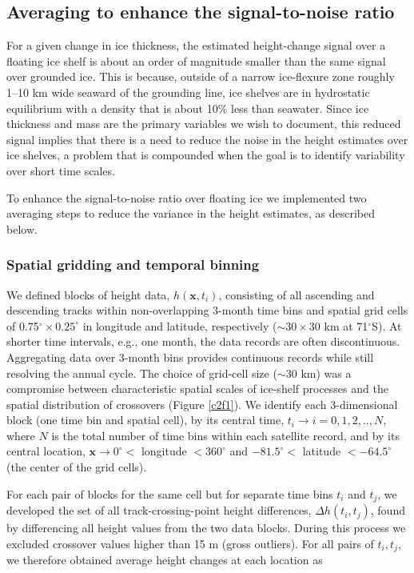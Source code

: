 \subsection{Averaging to enhance the signal-to-noise ratio}

For a given change in ice thickness, the estimated height-change signal over a floating ice shelf is about an order of magnitude smaller than the same signal over grounded ice. This is because, outside of a narrow ice-flexure zone roughly 1--10 km wide seaward of the grounding line, ice shelves are in hydrostatic equilibrium with a density that is about 10\% less than seawater. Since ice thickness and mass are the primary variables we wish to document, this reduced signal implies that there is a need to reduce the noise in the height estimates over ice shelves, a problem that is compounded when the goal is to identify variability over short time scales.

To enhance the signal-to-noise ratio over floating ice we implemented two averaging steps to reduce the variance in the height estimates, as described below.

\subsubsection{Spatial gridding and temporal binning}

We defined blocks of height data, $h(\mathbf{x},t_i)$, consisting of all ascending and descending tracks within non-overlapping 3-month time bins and spatial grid cells of 0.75$^\circ \times 0.25^\circ$ in longitude and latitude, respectively ($\sim30 \times 30$ km at 71$^\circ$S). At shorter time intervals, e.g., one month, the data records are often discontinuous. Aggregating data over 3-month bins provides continuous records while still resolving the annual cycle. The choice of grid-cell size ($\sim$30 km) was a compromise between characteristic spatial scales of ice-shelf processes and the spatial distribution of crossovers (Figure \ref{c2f1}). We identify each 3-dimensional block (one time bin and spatial cell), by its central time, $t_i \rightarrow i=0,1,2,..,N$, where $N$ is the total number of time bins within each satellite record, and by its central location, $\mathbf x \rightarrow 0^\circ <$ longitude $< 360^\circ$ and $-81.5^\circ <$ latitude $< -64.5^\circ$ (the center of the grid cells).

For each pair of blocks for the same cell but for separate time bins $t_i$ and $t_j$, we developed the set of all track-crossing-point height differences, ${\Delta h(t_i,t_j)}$, found by differencing all height values from the two data blocks. During this process we excluded crossover values higher than 15 m (gross outliers). For all pairs of ${t_i,t_j}$, we therefore obtained average height changes at each location as

